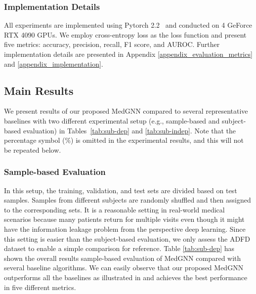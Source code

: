 \subsubsection{Implementation Details}
All experiments are implemented using Pytorch 2.2~\cite{paszke2019pytorch} and conducted on 4 GeForce RTX 4090 GPUs. We employ cross-entropy loss as the loss function and present five metrics: accuracy, precision, recall, F1 score, and AUROC. Further implementation details are presented in Appendix \ref{appendix_evaluation_metrics} and \ref{appendix_implementation}.




\vspace{-1mm}
\subsection{Main Results}
We present results of our proposed MedGNN compared to several representative baselines with two different experimental setup (e.g., sample-based and subject-based evaluation) in Tables~\ref{tab:sub-dep} and \ref{tab:sub-indep}.
Note that the percentage symbol (\%) is omitted in the experimental results, and this will not be repeated below.

\subsubsection{Sample-based Evaluation}
In this setup, the training, validation, and test sets are divided based on test samples. Samples from different subjects are randomly shuffled and then assigned to the corresponding sets. It is a reasonable setting in real-world medical scenarios because many patients return for multiple visits even though it might have the information leakage problem from the perspective deep learning. Since this setting is easier than the subject-based evaluation, we only assess the ADFD dataset to enable a simple comparison for reference. Table \ref{tab:sub-dep} has shown the overall results sample-based evaluation of MedGNN compared with several baseline algorithms. We can easily observe that our proposed MedGNN outperforms all the baselines as illustrated in and achieves the best performance in five different metrics. %


